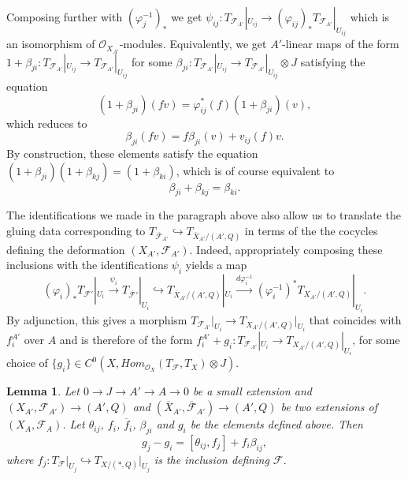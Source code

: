 \documentclass[reqno]{amsart}
\newcommand{\OO}{\mathcal{O}}
\newcommand{\F}{\mathscr{F}}
\newtheorem{lemma}[theorem]{Lemma}
\theoremstyle{definition}
\theoremstyle{named}
\begin{document}
Composing further with $(\varphi_j^{-1})_\ast$ we get   $\psi_{ij}:T_{\F_{A'}}|_{U_{ij}} \rightarrow (\varphi_{ij})_\ast T_{\F_{A'}}|_{U_{ij}}$ which is an isomorphism of $\OO_{X_{A'}}$-modules.
Equivalently, we get $A'$-linear maps of the form  $1+\beta_{ji}:T_{\F_{A'}}|_{U_{ij}} \rightarrow T_{\F_{A'}}|_{U_{ij}}$ for some  $\beta_{ji}:T_{\F_{A'}}|_{U_{ij}} \rightarrow T_{\F_{A'}}|_{U_{ij}}\otimes J$ satisfying the equation
\[
(1+\beta_{ji})(fv) = \varphi_{ij}^\ast(f) (1+ \beta_{ji})(v),
\]
which reduces to
\begin{equation*}
\beta_{ji}(fv) = f\beta_{ji}(v) + v_{ij}(f)v.
\end{equation*}
By construction, these elements satisfy the equation $(1+\beta_{ji})(1+\beta_{kj})=(1+\beta_{ki})$, which is of course equivalent to
$$ \beta_{ji}+\beta_{kj}=\beta_{ki}. $$



The identifications we made in the paragraph above also allow us to translate the gluing data corresponding to $T_{\overline{\F}_{A'}}\hookrightarrow T_{\overline{X}_{A'}/(A',Q)}$ in terms of the the cocycles defining the deformation $(X_{A'},\F_{A'})$.
Indeed, appropriately composing these inclusions with the identifications $\psi_i$ yields a map
$$(\varphi_i)_\ast T_{\F'}|_{U_i}\xrightarrow{\psi_i}  T_{\overline{\F}'}|_{U_i}\hookrightarrow T_{\overline{X}_{A'}/(A',Q)}|_{U_i}\xrightarrow{d\varphi_i^{-1}} (\varphi^{-1}_i)^\ast T_{X_{A'}/( A',Q)}|_{U_i}.$$
By adjunction, this gives a morphism $T_{\F_{A'}}\vert_{U_i}\to T_{X_{A'}/(A',Q)}\vert_{U_i}$ that coincides with $f_i^{A'}$ over $A$ and is therefore of the form  $f_i^{A'}+g_i:T_{\F_{A'}}|_{U_i}\rightarrow T_{X_{A'}/(A',Q)}|_{U_i}$, for some choice of $\{g_i\}\in C^0(X,Hom_{\OO_X}(T_{\F}, T_X)\otimes J)$.

\begin{lemma}
    Let $0\rightarrow J\rightarrow A'\rightarrow A\rightarrow 0$ be a small extension and $(X_{A'},\F_{A'})\to (A',Q)$ and $(\overline{X}_{A'},\overline{\F}_{A'})\to (A',Q)$ be two extensions of $(X_A,\F_A)$. Let $\theta_{ij}$, $f_i$, $\overline{f}_i$, $\beta_{ji}$ and $g_i$ be the elements defined above. Then
    $$ g_j-g_i= [\theta_{ij},f_j]+f_i\beta_{ij},$$
where $f_j: T_{\F}\vert_{U_j}\hookrightarrow T_{X/(\ast,Q)}\vert_{U_j}$ is the inclusion defining $\F$.
\end{lemma}
\end{document}
